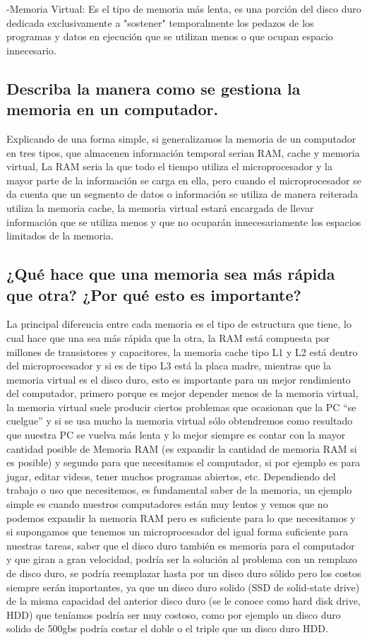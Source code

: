 \documentclass{article}
\begin{document}
-Memoria Virtual: Es el tipo de memoria más lenta, es una porción del disco duro dedicada exclusivamente a "sostener"  temporalmente los pedazos de los programas y datos en ejecución que se utilizan menos o que ocupan espacio innecesario.\cite{Augusto} \\

\subsection{Describa la manera como se gestiona la memoria en un computador.}
Explicando de una forma simple, si generalizamos la memoria de un computador en tres tipos, que almacenen información temporal serian RAM, cache y memoria virtual, La RAM seria la que todo el tiempo utiliza el microprocesador y la mayor parte de la información se carga en ella, pero cuando el microprocesador se da cuenta que un segmento de datos o información se utiliza de manera reiterada utiliza la memoria cache, la memoria virtual estará encargada de llevar información que se utiliza menos y que no ocuparán innecesariamente los espacios limitados de la memoria. 
\cite{Augusto}

\subsection{¿Qué hace que una memoria sea más rápida que otra? ¿Por qué esto es importante?}
La principal diferencia entre cada memoria es el tipo de estructura que tiene, lo cual hace que una sea más rápida que la otra, la RAM está compuesta por millones de transistores y capacitores,\cite{Augusto} la memoria cache tipo L1 y L2 está dentro del microprocesador y si es de tipo L3 está la placa madre, mientras que la memoria virtual es el disco duro, esto es importante para un mejor rendimiento del computador, primero porque es mejor depender menos de la memoria virtual, la memoria virtual suele producir ciertos problemas que ocasionan que la PC “se cuelgue” y si se usa mucho la memoria virtual sólo obtendremos como resultado que nuestra PC se vuelva más lenta \cite{Venturini} y lo mejor siempre es contar con la mayor cantidad posible de Memoria RAM (es expandir la cantidad de memoria RAM si es posible) y segundo para que necesitamos el computador, si por ejemplo es para jugar, editar videos, tener muchos programas abiertos, etc. Dependiendo del trabajo o uso que necesitemos, es fundamental saber de la memoria, un ejemplo simple es cuando nuestros computadores están muy lentos y vemos que no podemos expandir la memoria RAM pero es suficiente para lo que necesitamos y si supongamos que tenemos un microprocesador del igual forma suficiente para nuestras tareas, saber que el disco duro también es memoria para el computador y  que giran a gran velocidad, podría ser la solución al problema con un remplazo de disco duro, se podría reemplazar hasta por un disco duro sólido pero los costos siempre serán importantes, ya que un disco duro solido (SSD de solid-state drive) de la misma capacidad del anterior disco duro (se le conoce como hard disk drive, HDD) que teníamos podría ser muy costoso, como por ejemplo un disco duro solido de 500gbs podría costar el doble o el triple que un disco duro HDD.
\end{document}
